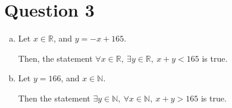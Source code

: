 \documentclass[12pt]{article}
\begin{document}
\section*{Question 3}
\begin{enumerate}[a.]
    \item

    Let $x \in \mathbb{R}$, and $y = -x + 165$.

    \bigskip

    Then, the statement $\forall x \in \mathbb{R},\: \exists y \in \mathbb{R},\:
    x + y < 165$ is true.

    \item

    Let $y = 166$, and $x \in \mathbb{N}$.

    \bigskip

    Then the statement $\exists y \in \mathbb{N},\:\forall x \in \mathbb{N},\:
    x+y >165$ is true.


\end{enumerate}
\end{document}
